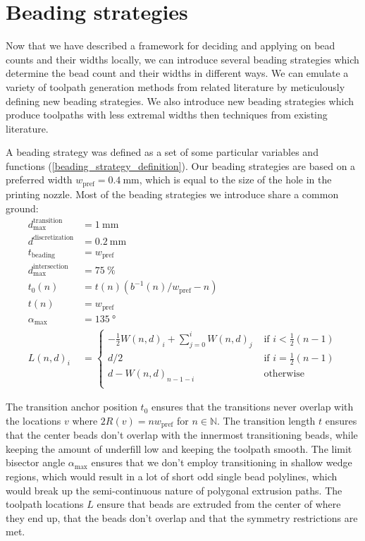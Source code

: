 \section{Beading strategies}
Now that we have described a framework for deciding and applying on bead counts and their widths locally, we can introduce several beading strategies which determine the bead count and their widths in different ways.
We can emulate a variety of toolpath generation methods from related literature by meticulously defining new beading strategies.
We also introduce new beading strategies which produce toolpaths with less extremal widths then techniques from existing literature.

A beading strategy was defined as a set of some particular variables and functions (\cref{beading_strategy_definition}).
Our beading strategies are based on a preferred width $w_\text{pref} = \SI{0.4}{\milli\meter}$, which is equal to the size of the hole in the printing nozzle.
Most of the beading strategies we introduce share a common ground:
\begin{align*}
d_\text{max}^\text{transition} &= \SI{1}{\milli\meter} \\
d^\text{discretization} &= \SI{0.2}{\milli\meter} \\
t_\text{beading} &= w_\text{pref} \\
d_\text{max}^\text{intersection} &= \SI{75}{\percent} \\
%
t_0(n) &=  t(n) \left( b^{-1}(n) / w_\text{pref}  - n \right) \\
t(n) &= w_\text{pref} \\
\alpha_\text{max} &= \SI{135}{\degree} \\
L(n,d)_i &= 
\begin{cases}
-\frac12 W(n,d)_i + \sum_{j=0}^i W(n,d)_j & \text{ if } i < \frac12 (n -1) \\
d/2 & \text{ if } i =  \frac12 (n -1) \\
d - W(n,d)_{n-1-i} & \text{ otherwise }\\
\end{cases}
\end{align*}

The transition anchor position $t_0$ ensures that the transitions never overlap with the locations $v$ where $2 R(v) = n w_\text{pref}$ for $n \in \mathbb{N}$.
The transition length $t$ ensures that the center beads don't overlap with the innermost transitioning beads, while keeping the amount of underfill low and keeping the toolpath smooth.
The limit bisector angle $\alpha_\text{max}$ ensures that we don't employ transitioning in shallow wedge regions, which would result in a lot of short odd single bead polylines, which would break up the semi-continuous nature of polygonal extrusion paths.
The toolpath locations $L$ ensure that beads are extruded from the center of where they end up, that the beads don't overlap and that the symmetry restrictions are met.


